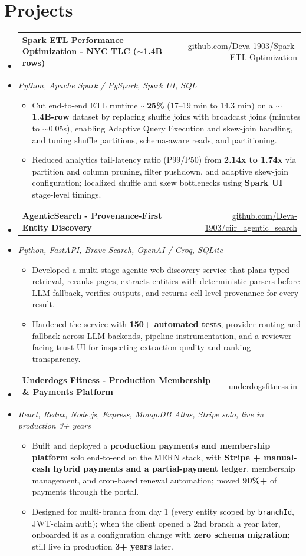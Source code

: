 \documentclass[letterpaper,10pt]{article}
\makeatletter
\newcommand{\resumeItem}[1]{
  \item\small{#1\vspace{-1pt}}
}
\newcommand{\resumeProjectHeading}[2]{
    \item
    \begin{tabular*}{0.985\textwidth}[t]{l@{\extracolsep{\fill}}r}
      \small\textbf{#1} & \small #2 \\
    \end{tabular*}\vspace{-5pt}
}
\newcommand{\resumeProjectSubheading}[1]{
  \vspace{-2pt}\item[] {\small\textcolor{ResumeSlate}{\emph{#1}}}\vspace{-3pt}
}
\newcommand{\resumeSubHeadingListStart}{\begin{itemize}[leftmargin=0.0in, label={}, itemsep=2pt, topsep=2pt]}
\newcommand{\resumeSubHeadingListEnd}{\end{itemize}}
\newcommand{\resumeItemListStart}{\begin{itemize}[leftmargin=0.18in, itemsep=2pt, topsep=1pt]}
\newcommand{\resumeItemListEnd}{\end{itemize}\vspace{-4pt}}
\makeatother
\begin{document}
\section{Projects}
\resumeSubHeadingListStart
  \resumeProjectHeading
    {Spark ETL Performance Optimization - NYC TLC (\(\sim\)1.4B rows)}
    {\href{https://github.com/Deva-1903/Spark-ETL-Optimization}{github.com/Deva-1903/Spark-ETL-Optimization}}
  \resumeProjectSubheading{Python, Apache Spark / PySpark, Spark UI, SQL}
    \resumeItemListStart
      \resumeItem{Cut end-to-end ETL runtime \textbf{\(\sim\)25\%} (17--19 min to 14.3 min) on a \textbf{\(\sim\)1.4B-row} dataset by replacing shuffle joins with broadcast joins (minutes to \(\sim\)0.05s), enabling Adaptive Query Execution and skew-join handling, and tuning shuffle partitions, schema-aware reads, and partitioning.}
      \resumeItem{Reduced analytics tail-latency ratio (P99/P50) from \textbf{2.14x to 1.74x} via partition and column pruning, filter pushdown, and adaptive skew-join configuration; localized shuffle and skew bottlenecks using \textbf{Spark UI} stage-level timings.}
    \resumeItemListEnd
  \resumeProjectHeading
    {AgenticSearch - Provenance-First Entity Discovery}
    {\href{https://github.com/Deva-1903/ciir_agentic_search}{github.com/Deva-1903/ciir\_agentic\_search}}
  \resumeProjectSubheading{Python, FastAPI, Brave Search, OpenAI / Groq, SQLite}
    \resumeItemListStart
      \resumeItem{Developed a multi-stage agentic web-discovery service that plans typed retrieval, reranks pages, extracts entities with deterministic parsers before LLM fallback, verifies outputs, and returns cell-level provenance for every result.}
      \resumeItem{Hardened the service with \textbf{150+ automated tests}, provider routing and fallback across LLM backends, pipeline instrumentation, and a reviewer-facing trust UI for inspecting extraction quality and ranking transparency.}
    \resumeItemListEnd
  \resumeProjectHeading
    {Underdogs Fitness - Production Membership \& Payments Platform}
    {\href{https://www.underdogsfitness.in/}{underdogsfitness.in}}
  \resumeProjectSubheading{React, Redux, Node.js, Express, MongoDB Atlas, Stripe \enspace\textbar\enspace solo, live in production 3+ years}
    \resumeItemListStart
      \resumeItem{Built and deployed a \textbf{production payments and membership platform} solo end-to-end on the MERN stack, with \textbf{Stripe + manual-cash hybrid payments and a partial-payment ledger}, membership management, and cron-based renewal automation; moved \textbf{90\%+} of payments through the portal.}
      \resumeItem{Designed for multi-branch from day 1 (every entity scoped by \texttt{branchId}, JWT-claim auth); when the client opened a 2nd branch a year later, onboarded it as a configuration change with \textbf{zero schema migration}; still live in production \textbf{3+ years} later.}
    \resumeItemListEnd
\resumeSubHeadingListEnd
\vspace{-4pt}
\end{document}
